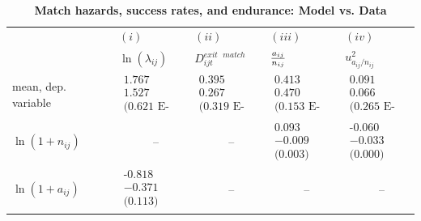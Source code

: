 \documentclass[12pt]{article}
\begin{document}
\begin{table}[tbp]
\caption{\textbf{Match hazards, success rates, and endurance: Model vs. Data}
}
\label{tab:haz_model_data}
{\small \ }
\par
{\small 
\begin{tabular}{lllll}
\hline\hline
& $(i)$ & $(ii)$ & $(iii)$ & $(iv)$ \\ 
& $\ln (\lambda _{ij})$ & $D_{ijt}^{exit\text{ }match}$ & $\frac{a_{ij}}{%
n_{ij}}$ & $u_{a_{ij}/n_{ij}}^{2}$ \\ \hline
mean, dep. variable & $%
\begin{array}{c}
\text{1.767} \\ 
1.527 \\ 
\text{(0.621 E-2)}%
\end{array}%
$ & $%
\begin{array}{c}
\text{0.395} \\ 
0.267 \\ 
\text{(0.319 E-2)}%
\end{array}%
$ & $%
\begin{array}{c}
\text{0.413} \\ 
0.470 \\ 
\text{(0.153 E-2)}%
\end{array}%
$ & $%
\begin{array}{c}
\text{0.091} \\ 
0.066 \\ 
\text{(0.265 E-3)}%
\end{array}%
$ \\ \cline{2-5}
$\ln (1+n_{ij})$ & \ \ \ \ \ \ -- & \ \ \ \ \ \ -- & $%
\begin{array}{c}
\text{0.093} \\ 
-0.009 \\ 
\text{(0.003)}%
\end{array}%
$ & $%
\begin{array}{c}
\text{-0.060} \\ 
-0.033 \\ 
\text{(0.000)}%
\end{array}%
$ \\ \cline{2-5}
$\ln (1+a_{ij})$ & $%
\begin{array}{c}
\text{-0.818} \\ 
-0.371 \\ 
\text{(0.113)}%
\end{array}%
$ & \ \ \ \ \ \ -- & \ \ \ \ \ \ -- & \ \ \ \ \ \ -- \\ \cline{2-5}

\end{tabular}}
\end{table}
\end{document}
